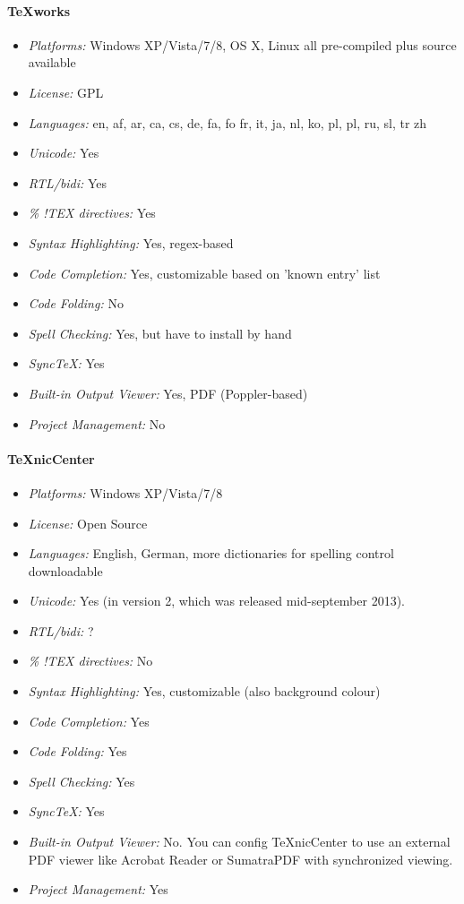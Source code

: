 \paragraph{TeXworks}

\begin{itemize}
    \item \textit{Platforms:} Windows XP/Vista/7/8, OS X, Linux all pre-compiled plus source available
    \item \textit{License:} GPL
    \item \textit{Languages:} en, af, ar, ca, cs, de, fa, fo fr, it, ja, nl, ko, pl, pl, ru, sl, tr zh
    \item \textit{Unicode:} Yes
    \item \textit{RTL/bidi:} Yes
    \item \textit{\% !TEX directives:} Yes
    \item \textit{Syntax Highlighting:} Yes, regex-based
    \item \textit{Code Completion:} Yes, customizable based on 'known entry' list
    \item \textit{Code Folding:} No
    \item \textit{Spell Checking:} Yes, but have to install by hand
    \item \textit{SyncTeX:} Yes
    \item \textit{Built-in Output Viewer:} Yes, PDF (Poppler-based)
    \item \textit{Project Management:} No
\end{itemize}

\paragraph{TeXnicCenter}

\begin{itemize}
    \item \textit{Platforms:} Windows XP/Vista/7/8
    \item \textit{License:} Open Source
    \item \textit{Languages:} English, German, more dictionaries for spelling control downloadable
    \item \textit{Unicode:} Yes (in version 2, which was released mid-september 2013).
    \item \textit{RTL/bidi:} ?
    \item \textit{\% !TEX directives:} No
    \item \textit{Syntax Highlighting:} Yes, customizable (also background colour)
    \item \textit{Code Completion:} Yes
    \item \textit{Code Folding:} Yes
    \item \textit{Spell Checking:} Yes
    \item \textit{SyncTeX:} Yes
    \item \textit{Built-in Output Viewer:} No. You can config TeXnicCenter to use an external PDF viewer like Acrobat Reader or SumatraPDF with synchronized viewing.
    \item \textit{Project Management:} Yes
\end{itemize}

